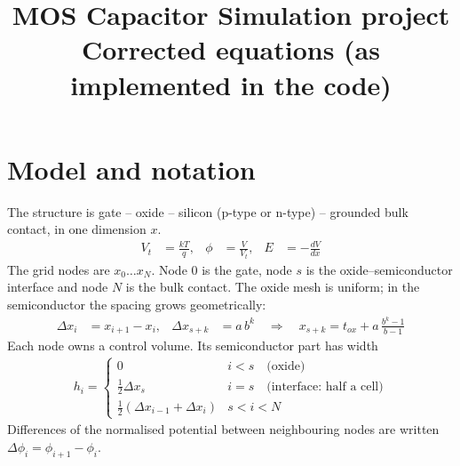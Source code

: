 \documentclass[11pt]{article}
\title{MOS Capacitor Simulation project\\[4pt]\large Corrected equations (as implemented in the code)}
\date{}
\newcommand{\dphi}[1]{\Delta\phi_{#1}}
\newcommand{\half}{\tfrac{1}{2}}
\begin{document}
\maketitle

\section{Model and notation}
The structure is gate -- oxide -- silicon (p-type or n-type) -- grounded bulk contact, in one dimension $x$.
\begin{align}
V_t &= \frac{kT}{q}, & \phi &= \frac{V}{V_t}, & E &= -\frac{dV}{dx}
\end{align}
The grid nodes are $x_0\dots x_N$. Node $0$ is the gate, node $s$ is the oxide--semiconductor interface and
node $N$ is the bulk contact. The oxide mesh is uniform; in the semiconductor the spacing grows geometrically:
\begin{align}
\Delta x_i &= x_{i+1}-x_i, & \Delta x_{s+k} &= a\,b^{k}
\quad\Longrightarrow\quad x_{s+k} = t_{ox} + a\,\frac{b^{k}-1}{b-1}
\end{align}
Each node owns a control volume. Its semiconductor part has width
\begin{align}
h_i = \begin{cases} 0 & i<s \quad\text{(oxide)}\\[2pt]
\half\Delta x_s & i=s \quad\text{(interface: half a cell)}\\[2pt]
\half\left(\Delta x_{i-1}+\Delta x_i\right) & s<i<N \end{cases}
\end{align}
Differences of the normalised potential between neighbouring nodes are written
$\dphi{i}=\phi_{i+1}-\phi_i$.
\end{document}
